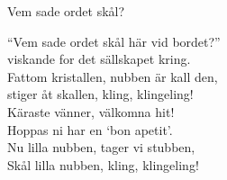 \begin{song}{Vem sade ordet skål?}

	

    “Vem sade ordet skål här vid bordet?”\\
	viskande for det sällskapet kring.\\
	Fattom kristallen, nubben är kall den,\\
	stiger åt skallen, kling, klingeling!\\
	Käraste vänner, välkomna hit!\\
	Hoppas ni har en ‘bon apetit’.\\
	Nu lilla nubben, tager vi stubben,\\
	Skål lilla nubben, kling, klingeling!
	
\end{song}
